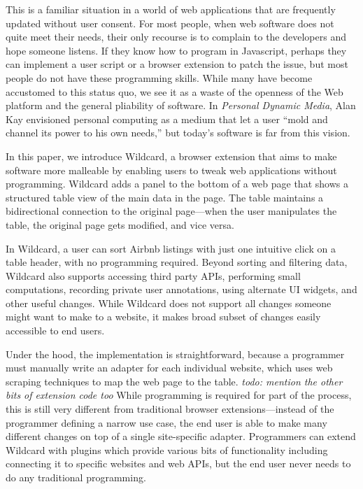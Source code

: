 \documentclass[english,submission]{programming}
\begin{document}
This is a familiar situation in a world of web applications that are
frequently updated without user consent. For most people, when web
software does not quite meet their needs, their only recourse is to
complain to the developers and hope someone listens. If they know how to
program in Javascript, perhaps they can implement a user script or a
browser extension to patch the issue, but most people do not have these
programming skills. While many have become accustomed to this status
quo, we see it as a waste of the openness of the Web platform and the
general pliability of software. In \emph{Personal Dynamic Media}, Alan
Kay envisioned personal computing as a medium that let a user ``mold and
channel its power to his own needs,'' but today's software is far from
this vision.

In this paper, we introduce Wildcard, a browser extension that aims to
make software more malleable by enabling users to tweak web applications
without programming. Wildcard adds a panel to the bottom of a web page
that shows a structured table view of the main data in the page. The
table maintains a bidirectional connection to the original page---when
the user manipulates the table, the original page gets modified, and
vice versa.

In Wildcard, a user can sort Airbnb listings with just one intuitive
click on a table header, with no programming required. Beyond sorting
and filtering data, Wildcard also supports accessing third party APIs,
performing small computations, recording private user annotations, using
alternate UI widgets, and other useful changes. While Wildcard does not
support all changes someone might want to make to a website, it makes
broad subset of changes easily accessible to end users.

Under the hood, the implementation is straightforward, because a
programmer must manually write an adapter for each individual website,
which uses web scraping techniques to map the web page to the table.
\emph{todo: mention the other bits of extension code too} While
programming is required for part of the process, this is still very
different from traditional browser extensions---instead of the
programmer defining a narrow use case, the end user is able to make many
different changes on top of a single site-specific adapter. Programmers
can extend Wildcard with plugins which provide various bits of
functionality including connecting it to specific websites and web APIs,
but the end user never needs to do any traditional programming.
\end{document}
